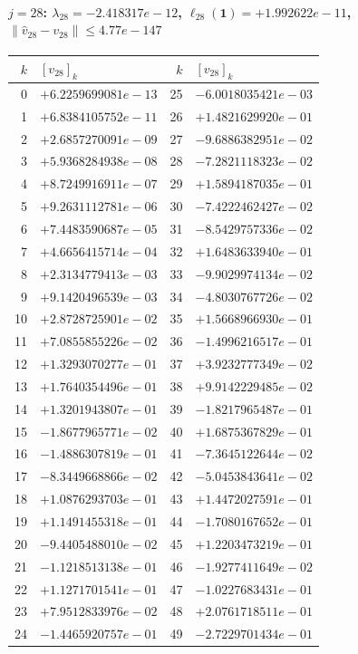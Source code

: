 \documentclass[11pt]{article}
\begin{document}
\paragraph{$j = 28$: $\lambda_{28} = -2.418317e-12$, \quad $\ell_{28}(\mathbf{1}) = +1.992622e-11$, \quad $\|\hat v_{28} - v_{28}\| \leq 4.77e-147$}
\begin{center}
{\footnotesize
\begin{tabular}{r@{\;\;}l@{\quad}r@{\;\;}l}
\toprule
$k$ & $[v_{28}]_k$ & $k$ & $[v_{28}]_k$ \\
\midrule
0 & $+6.2259699081e-13$ & 25 & $-6.0018035421e-03$ \\
1 & $+6.8384105752e-11$ & 26 & $+1.4821629920e-01$ \\
2 & $+2.6857270091e-09$ & 27 & $-9.6886382951e-02$ \\
3 & $+5.9368284938e-08$ & 28 & $-7.2821118323e-02$ \\
4 & $+8.7249916911e-07$ & 29 & $+1.5894187035e-01$ \\
5 & $+9.2631112781e-06$ & 30 & $-7.4222462427e-02$ \\
6 & $+7.4483590687e-05$ & 31 & $-8.5429757336e-02$ \\
7 & $+4.6656415714e-04$ & 32 & $+1.6483633940e-01$ \\
8 & $+2.3134779413e-03$ & 33 & $-9.9029974134e-02$ \\
9 & $+9.1420496539e-03$ & 34 & $-4.8030767726e-02$ \\
10 & $+2.8728725901e-02$ & 35 & $+1.5668966930e-01$ \\
11 & $+7.0855855226e-02$ & 36 & $-1.4996216517e-01$ \\
12 & $+1.3293070277e-01$ & 37 & $+3.9232777349e-02$ \\
13 & $+1.7640354496e-01$ & 38 & $+9.9142229485e-02$ \\
14 & $+1.3201943807e-01$ & 39 & $-1.8217965487e-01$ \\
15 & $-1.8677965771e-02$ & 40 & $+1.6875367829e-01$ \\
16 & $-1.4886307819e-01$ & 41 & $-7.3645122644e-02$ \\
17 & $-8.3449668866e-02$ & 42 & $-5.0453843641e-02$ \\
18 & $+1.0876293703e-01$ & 43 & $+1.4472027591e-01$ \\
19 & $+1.1491455318e-01$ & 44 & $-1.7080167652e-01$ \\
20 & $-9.4405488010e-02$ & 45 & $+1.2203473219e-01$ \\
21 & $-1.1218513138e-01$ & 46 & $-1.9277411649e-02$ \\
22 & $+1.1271701541e-01$ & 47 & $-1.0227683431e-01$ \\
23 & $+7.9512833976e-02$ & 48 & $+2.0761718511e-01$ \\
24 & $-1.4465920757e-01$ & 49 & $-2.7229701434e-01$ \\
\bottomrule
\end{tabular}
}
\end{center}
\end{document}
